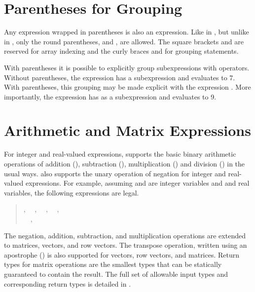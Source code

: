 \section{Parentheses for Grouping}

Any expression wrapped in parentheses is also an expression. Like in
\Cpp, but unlike in \R, only the round parentheses, \code{(} and
\code{)}, are allowed.  The square brackets \code{[} and \code{]} are
reserved for array indexing and the curly braces \code{\{} and
\code{\}} for grouping statements.

With parentheses it is possible to explicitly group subexpressions
with operators.  Without parentheses, the expression 
has a subexpression  and evaluates to 7.  With
parentheses, this grouping may be made explicit with the expression
.  More importantly, the expression  has  as a subexpression and evaluates to 9.


\section{Arithmetic and Matrix Expressions}

For integer and real-valued expressions, \Stan supports the basic
binary arithmetic operations of addition (\code{+}), subtraction
(\code{-}), multiplication (\code{*}) and division (\code{/}) in the
usual ways.  \Stan also supports the unary operation of negation for
integer and real-valued expressions.  For example, assuming 
and  are integer variables and  and  real
variables, the following expressions are legal.
\begin{quote}
, 
\ \ ,
\ \ , 
\ \ ,
\\
\ \ ,
\ \ 
\end{quote}
%
The negation, addition, subtraction, and multiplication operations are
extended to matrices, vectors, and row vectors.  The transpose
operation, written using an apostrophe () is also supported
for vectors, row vectors, and matrices.  Return types for matrix
operations are the smallest types that can be statically guaranteed to
contain the result.  The full set of allowable input types and
corresponding return types is detailed in
.

